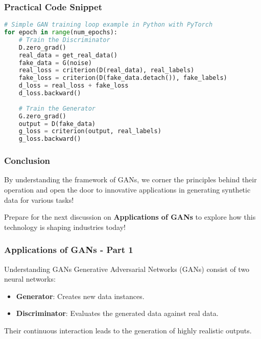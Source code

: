 \documentclass[aspectratio=169]{beamer}
\begin{document}
\begin{frame}[fragile]
    \frametitle{Practical Code Snippet}
    \begin{lstlisting}[language=Python]
# Simple GAN training loop example in Python with PyTorch
for epoch in range(num_epochs):
    # Train the Discriminator
    D.zero_grad()
    real_data = get_real_data()
    fake_data = G(noise)
    real_loss = criterion(D(real_data), real_labels)
    fake_loss = criterion(D(fake_data.detach()), fake_labels)
    d_loss = real_loss + fake_loss
    d_loss.backward()
    
    # Train the Generator
    G.zero_grad()
    output = D(fake_data)
    g_loss = criterion(output, real_labels)
    g_loss.backward()
    \end{lstlisting}
\end{frame}

\begin{frame}[fragile]
    \frametitle{Conclusion}
    By understanding the framework of GANs, we corner the principles behind their operation and open the door to innovative applications in generating synthetic data for various tasks!
    
    Prepare for the next discussion on \textbf{Applications of GANs} to explore how this technology is shaping industries today!
\end{frame}

\begin{frame}[fragile]
    \frametitle{Applications of GANs - Part 1}
    \begin{block}{Understanding GANs}
        Generative Adversarial Networks (GANs) consist of two neural networks:
        \begin{itemize}
            \item \textbf{Generator}: Creates new data instances.
            \item \textbf{Discriminator}: Evaluates the generated data against real data.
        \end{itemize}
        Their continuous interaction leads to the generation of highly realistic outputs.
    \end{block}
\end{frame}
\end{document}
